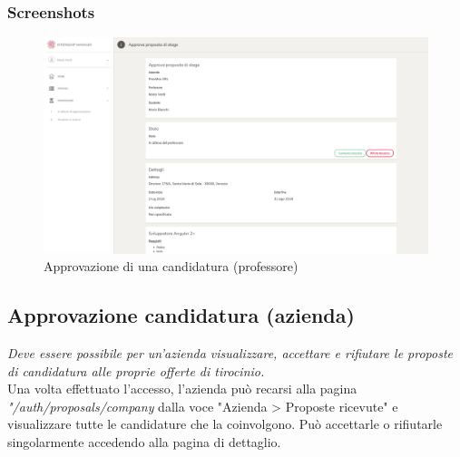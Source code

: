 \subsubsection{Screenshots}
\begin{figure}[H]
	\centering
	\includegraphics[width=1\textwidth]{Chapter3/Figs/screenshots/internshipproposalapprove}     
	\caption[Screenshot: approvazione di una candidatura (professore)]{Approvazione di una candidatura (professore)}
	\label{fig:screenshot:5}
\end{figure}

\pagebreak
\subsection{Approvazione candidatura (azienda)}\label{sec:approvazione-candidatura-azienda}

\textit{Deve essere possibile per un'azienda visualizzare, accettare e rifiutare le proposte di candidatura alle proprie offerte di tirocinio.} \\

\noindent
Una volta effettuato l'accesso, l'azienda può recarsi alla pagina \textit{"/auth/proposals/company} dalla voce "Azienda > Proposte ricevute" e visualizzare tutte le candidature che la coinvolgono. Può accettarle o rifiutarle singolarmente accedendo alla pagina di dettaglio.

